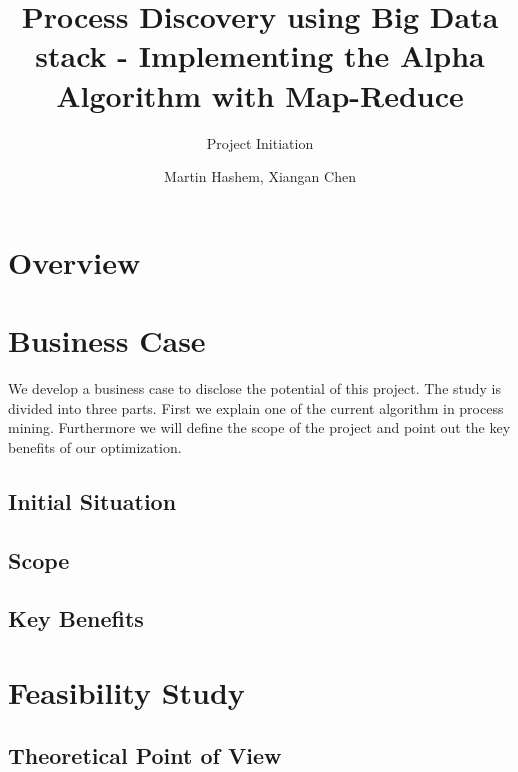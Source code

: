 \documentclass[runningheads]{llncs}
\begin{document}
%
\title{Process Discovery using Big Data stack - Implementing the Alpha Algorithm with Map-Reduce}
\subtitle{Project Initiation}
%
%

\author{{\large Martin Hashem, Xiangan Chen}}

%
\maketitle              %
%
%
%
%
\section{Overview}
\section{Business Case}
We develop a business case to disclose the potential of this project. The study is divided into three parts. First we explain one of the current algorithm in process mining. Furthermore we will define the scope of the project and point out the key benefits of our optimization.
\subsection{Initial Situation}
\subsection{Scope}
\subsection{Key Benefits}

\section{Feasibility Study}

\subsection{Theoretical Point of View}
\end{document}
